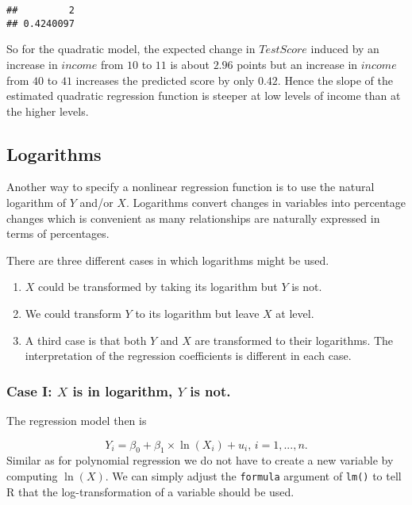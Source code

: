 \documentclass[]{book}
\theoremstyle{definition}
\theoremstyle{definition}
\theoremstyle{definition}
\theoremstyle{remark}
\begin{document}
\begin{verbatim}
##         2 
## 0.4240097
\end{verbatim}

So for the quadratic model, the expected change in \(TestScore\) induced
by an increase in \(income\) from \(10\) to \(11\) is about \(2.96\)
points but an increase in \(income\) from \(40\) to \(41\) increases the
predicted score by only \(0.42\). Hence the slope of the estimated
quadratic regression function is steeper at low levels of income than at
the higher levels.

\subsection*{Logarithms}\label{logarithms}

Another way to specify a nonlinear regression function is to use the
natural logarithm of \(Y\) and/or \(X\). Logarithms convert changes in
variables into percentage changes which is convenient as many
relationships are naturally expressed in terms of percentages.

There are three different cases in which logarithms might be used.

\begin{enumerate}
\def\labelenumi{\arabic{enumi}.}
\item
  \(X\) could be transformed by taking its logarithm but \(Y\) is not.
\item
  We could transform \(Y\) to its logarithm but leave \(X\) at level.
\item
  A third case is that both \(Y\) and \(X\) are transformed to their
  logarithms. The interpretation of the regression coefficients is
  different in each case.
\end{enumerate}

\subsubsection*{\texorpdfstring{Case I: \(X\) is in logarithm, \(Y\) is
not.}{Case I: X is in logarithm, Y is not.}}\label{case-i-x-is-in-logarithm-y-is-not.}

The regression model then is

\[Y_i = \beta_0 + \beta_1 \times \ln(X_i) + u_i \text{, } i=1,...,n. \]
Similar as for polynomial regression we do not have to create a new
variable by computing \(\ln(X)\). We can simply adjust the
\texttt{formula} argument of \texttt{lm()} to tell R that the
log-transformation of a variable should be used.
\end{document}
